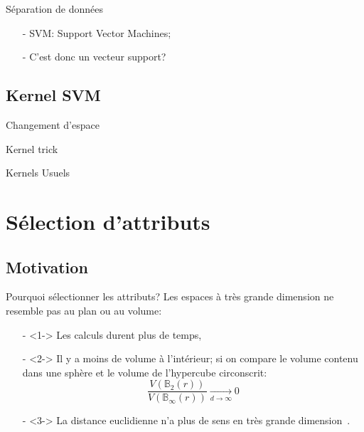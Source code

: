 \documentclass[9pt]{beamer}
\begin{document}
	\begin{frame}{Séparation de données}
		\begin{itemize}
			\item[-] SVM: Support Vector Machines;
			\item[-] C'est donc un vecteur support?
		\end{itemize}
	\end{frame}

	\subsection[kernel]{Kernel SVM}
	\begin{frame}{Changement d'espace}

	\end{frame}

	\begin{frame}{Kernel trick}

	\end{frame}

	\begin{frame}{Kernels Usuels}

	\end{frame}

	\section[feature selection]{Sélection d'attributs}
	\subsection[motivation]{Motivation}
	\begin{frame}{Pourquoi sélectionner les attributs?}
		Les espaces à très grande dimension ne resemble pas au plan ou au volume:
		\begin{itemize}
			\item[-]<1-> Les calculs durent plus de temps,
			\item[-]<2-> Il y a moins de volume à l'intérieur; si on compare le volume contenu dans une sphère et le volume de l'hypercube circonscrit:
			$$\frac{V(\mathbb{B}_{2}(r))}{V(\mathbb{B}_{\infty}(r))}\xrightarrow[d \to \infty]{} 0$$
			\item[-]<3-> La distance euclidienne n'a plus de sens en très grande dimension~\cite{Domingos:2012:FUT:2347736.2347755}.
		\end{itemize}
	\end{frame}
\end{document}
